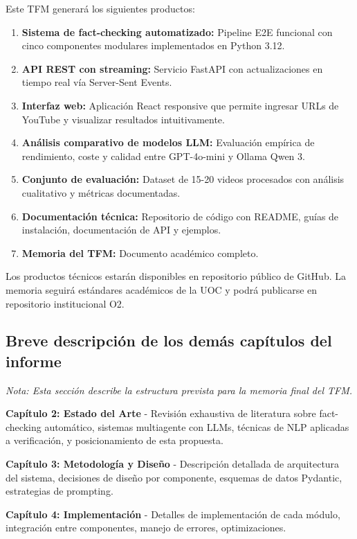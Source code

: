\documentclass[12pt,a4paper,twoside]{book}
\begin{document}
Este TFM generará los siguientes productos:

\begin{enumerate}
    \item \textbf{Sistema de fact-checking automatizado:} Pipeline E2E funcional con cinco componentes modulares implementados en Python 3.12.
    \item \textbf{API REST con streaming:} Servicio FastAPI con actualizaciones en tiempo real vía Server-Sent Events.
    \item \textbf{Interfaz web:} Aplicación React responsive que permite ingresar URLs de YouTube y visualizar resultados intuitivamente.
    \item \textbf{Análisis comparativo de modelos LLM:} Evaluación empírica de rendimiento, coste y calidad entre GPT-4o-mini y Ollama Qwen 3.
    \item \textbf{Conjunto de evaluación:} Dataset de 15-20 videos procesados con análisis cualitativo y métricas documentadas.
    \item \textbf{Documentación técnica:} Repositorio de código con README, guías de instalación, documentación de API y ejemplos.
    \item \textbf{Memoria del TFM:} Documento académico completo.
\end{enumerate}

Los productos técnicos estarán disponibles en repositorio público de GitHub. La memoria seguirá estándares académicos de la UOC y podrá publicarse en repositorio institucional O2.

\subsection{Breve descripción de los demás capítulos del informe}

\textit{Nota: Esta sección describe la estructura prevista para la memoria final del TFM.}

\textbf{Capítulo 2: Estado del Arte} - Revisión exhaustiva de literatura sobre fact-checking automático, sistemas multiagente con LLMs, técnicas de NLP aplicadas a verificación, y posicionamiento de esta propuesta.

\textbf{Capítulo 3: Metodología y Diseño} - Descripción detallada de arquitectura del sistema, decisiones de diseño por componente, esquemas de datos Pydantic, estrategias de prompting.

\textbf{Capítulo 4: Implementación} - Detalles de implementación de cada módulo, integración entre componentes, manejo de errores, optimizaciones.
\end{document}
